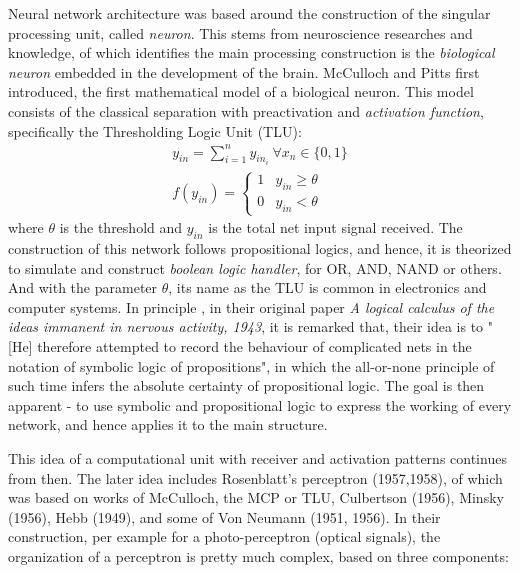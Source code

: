 Neural network architecture was based around the construction of the singular processing unit, called \textit{neuron}. This stems from neuroscience researches and knowledge, of which identifies the main processing construction is the \textit{biological neuron} embedded in the development of the brain. McCulloch and Pitts first introduced, the first mathematical model of a biological neuron. This model consists of the classical separation with preactivation and \textit{activation function}, specifically the Thresholding Logic Unit (TLU): 
\begin{align}
  y_{in} = \sum_{i =1}^{n} y_{in_{i}}\: \forall x_{n} \in \{0,1\} \\
  f(y_{in}) = 
  \begin{cases}
    1 & y_{in} \geq \theta \\
    0 & y_{in} < \theta
  \end{cases}
\end{align}
where \(\theta\) is the threshold and \(y_{in}\) is the total net input signal received. The construction of this network follows propositional logics, and hence, it is theorized to simulate and construct \textit{boolean logic handler}, for OR, AND, NAND or others. And with the parameter $\theta$, its name as the TLU is common in electronics and computer systems. In principle , in their original paper \textit{A logical calculus of the ideas immanent in nervous activity, 1943}, it is remarked that, their idea is to "[He] therefore attempted to record the behaviour of complicated nets in the notation of symbolic logic of propositions", in which the all-or-none principle of such time infers the absolute certainty of propositional logic. The goal is then apparent - to use symbolic and propositional logic to express the working of every network, and hence applies it to the main structure. 

This idea of a computational unit with receiver and activation patterns continues from then. The later idea includes Rosenblatt's perceptron (1957,1958), of which was based on works of McCulloch, the MCP or TLU, Culbertson (1956), Minsky  (1956), Hebb (1949), and some of Von Neumann (1951, 1956). In their construction, per example for a photo-perceptron (optical signals), the organization of a perceptron is pretty much complex, based on three components: 

